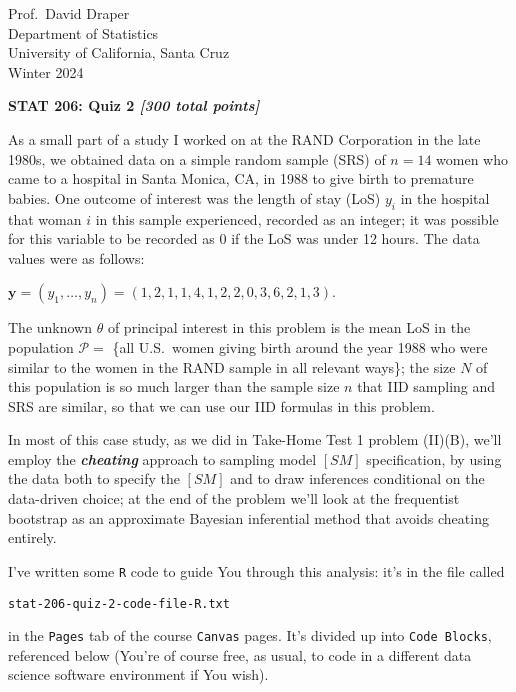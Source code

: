 \documentclass[12pt]{article}
\newcommand{\bi}[1]{\b{\i{#1}}}
\renewcommand{\b}[1]{\textbf{#1}}
\renewcommand{\i}[1]{\textit{#1}}
\renewcommand{\t}[1]{\texttt{#1}}
\begin{document}
\begin{flushleft}

Prof.~David Draper \\
Department of Statistics \\
University of California, Santa Cruz \\
Winter 2024

\end{flushleft}

\Large

\begin{center}

\textbf{\large STAT 206: Quiz 2 \textit{[300 total points]}}

\end{center}

\normalsize

As a small part of a study I worked on at the RAND Corporation in the late 1980s, we obtained data on a simple random sample (SRS) of $n = 14$ women who came to a hospital in
Santa Monica, CA, in 1988 to give birth to premature babies. One outcome of interest was
the length of stay (LoS) $y_i$ in the hospital that woman $i$ in this sample experienced, recorded as an integer; it was possible for this variable to be recorded as 0 if the LoS was under 12 hours. The data values were as follows: 

\begin{center}

$\bm{ y } = ( y_1, \dots, y_n ) = ( 1, 2, 1, 1, 4, 1, 2, 2, 0, 3, 6, 2, 1, 3 )$.

\end{center}

The unknown $\theta$ of principal interest in this problem is the mean LoS in the population $\mathcal{ P } =$ \{all U.S.~women giving birth around the year 1988 who were similar to the women in the RAND sample in all relevant ways\}; the size $N$ of this population is so much larger than the sample size $n$ that IID sampling and SRS are similar, so that we can use our IID formulas in this problem. 

In most of this case study, as we did in Take-Home Test 1 problem (II)(B), we'll employ the \bi{cheating} approach to sampling model $[SM]$ specification, by using the data both to specify the $[SM]$ and to draw inferences conditional on the data-driven choice; at the end of the problem we'll look at the frequentist bootstrap as an approximate Bayesian inferential method that avoids cheating entirely.

I've written some \t{R} code to guide You through this analysis: it's in the file called 
\begin{center}

\t{stat-206-quiz-2-code-file-R.txt} 

\end{center}
in the \t{Pages} tab of the course \t{Canvas} pages. It's divided up into \t{Code Blocks}, referenced below (You're of course free, as usual, to code in a different data science software environment if You wish).
\end{document}
